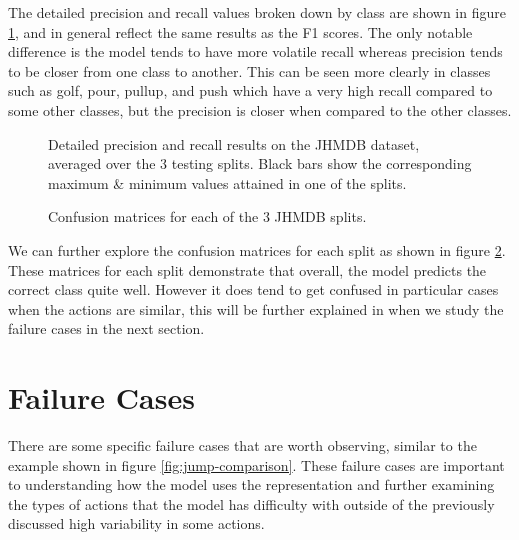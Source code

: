 The detailed precision and recall values broken down by class are shown in figure \ref{fig:detailed-precision-recall}, and in general reflect the same results as the F1 scores. The only notable difference is the model tends to have more volatile recall whereas precision tends to be closer from one class to another. This can be seen more clearly in classes such as golf, pour, pullup, and push which have a very high recall compared to some other classes, but the precision is closer when compared to the other classes.

\begin{figure}[p]
	\centering
	\caption{Detailed precision and recall results on the JHMDB dataset, averaged over the 3 testing splits. Black bars show the corresponding maximum \& minimum values attained in one of the splits.}
	\label{fig:detailed-precision-recall}
\end{figure}

\begin{figure}[p]
	\centering
	\caption{Confusion matrices for each of the 3 JHMDB splits.}
	\label{fig:confusion-matrices}
\end{figure}

\pagebreak

We can further explore the confusion matrices for each split as shown in figure \ref{fig:confusion-matrices}. These matrices for each split demonstrate that overall, the model predicts the correct class quite well. However it does tend to get confused in particular cases when the actions are similar, this will be further explained in when we study the failure cases in the next section.

\section{Failure Cases}
\label{sec:failure-cases}

There are some specific failure cases that are worth observing, similar to the example shown in figure \ref{fig:jump-comparison}. These failure cases are important to understanding how the model uses the representation and further examining the types of actions that the model has difficulty with outside of the previously discussed high variability in some actions.

